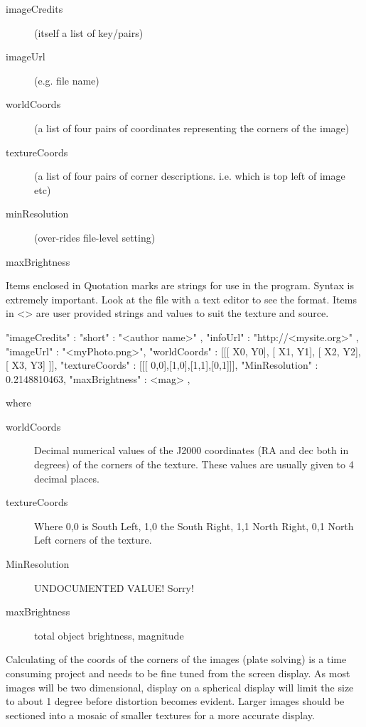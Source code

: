 \begin{description}
  \begin{description}
  \item[imageCredits] (itself a list of key/pairs)
  \item[imageUrl] (e.g. file name)
  \item[worldCoords] (a list of four pairs of coordinates representing the corners of the image)
  \item[textureCoords] (a list of four pairs of corner descriptions. i.e. which is top left of image etc)
  \item[minResolution] (over-rides file-level setting)
  \item[maxBrightness]
  \end{description}
\end{description}

Items enclosed in Quotation marks are strings for use in the program.
Syntax is extremely important. Look at the file with a text editor to
see the format. Items in \textless{}\textgreater{} are user provided
strings and values to suit the texture and source.

\begin{configfileScr}
{
  "imageCredits"  : { "short" : "<author name>" , 
                      "infoUrl" : "http://<mysite.org>" 
                    }, 
  "imageUrl"      : "<myPhoto.png>",
  "worldCoords"   : [[[ X0, Y0], [ X1, Y1], [ X2, Y2], [ X3, Y3] ]], 
  "textureCoords" : [[[ 0,0],[1,0],[1,1],[0,1]]], 
  "MinResolution" : 0.2148810463,
  "maxBrightness" : <mag>
},
\end{configfileScr}

where 

\begin{description}
\item[worldCoords] Decimal numerical values of the J2000 coordinates (RA and dec both in degrees) of the corners of the texture. These values are usually given to 4 decimal places.
\item[textureCoords]  Where 0,0 is South Left, 1,0 the South Right, 1,1 North Right, 0,1 North Left corners of the texture.
\item[MinResolution] UNDOCUMENTED VALUE! Sorry!%
\item[maxBrightness] total object brightness, magnitude 
\end{description}


Calculating of the coords of the corners of the images (plate solving) is
a time consuming project and needs to be fine tuned from the screen
display. As most images will be two dimensional, display on a spherical
display will limit the size to about 1 degree before distortion becomes
evident. Larger images should be sectioned into a mosaic of smaller
textures for a more accurate display.

